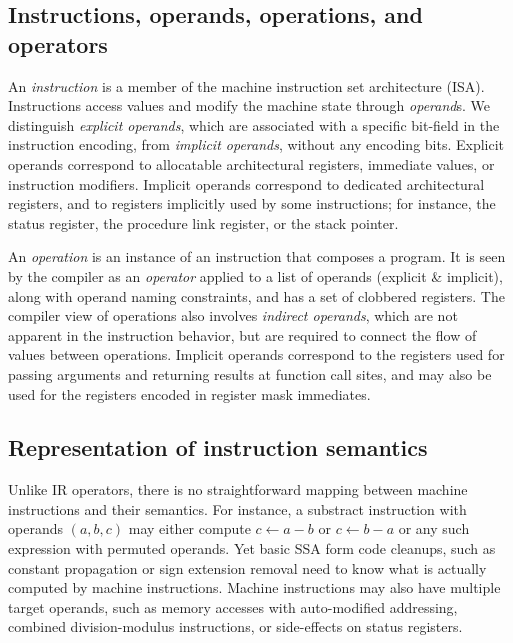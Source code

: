 \subsection{Instructions, operands, operations, and operators}

An \emph{instruction} is a member of the machine instruction set architecture
(ISA). Instructions access values and modify the machine state through
\emph{operand}s. We distinguish \emph{explicit operands}, which are associated
with a specific bit-field in the instruction encoding, from \emph{implicit
operands}, without any encoding bits.  Explicit operands correspond to
allocatable architectural registers, immediate values, or instruction modifiers.
Implicit operands correspond to dedicated architectural registers,
and to registers implicitly used by some instructions; for instance, the
status register, the procedure link register, or the stack pointer.

An \emph{operation} is an instance of an instruction that composes a program. It
is seen by the compiler as an \emph{operator} applied to a list of operands
(explicit \& implicit), along with operand naming constraints, and has a set of
clobbered registers. The compiler view of operations also involves
\emph{indirect operands}, which are not apparent in the instruction behavior,
but are required to connect the flow of values between operations.  Implicit
operands correspond to the registers used for passing arguments and returning
results at function call sites, and may also be used for the registers
encoded in register mask immediates.


\subsection{Representation of instruction semantics}

Unlike IR operators, there is no straightforward mapping between machine
instructions and their semantics. For instance, a substract instruction with
operands $(a,b,c)$ may either compute $c \leftarrow a-b$ or $c \leftarrow b-a$
or any such expression with permuted operands. Yet basic SSA form code cleanups,
such as constant propagation or sign extension removal need to know what is
actually computed by machine instructions. Machine instructions may also have
multiple target operands, such as memory accesses with auto-modified addressing,
combined division-modulus instructions, or side-effects on status registers.

